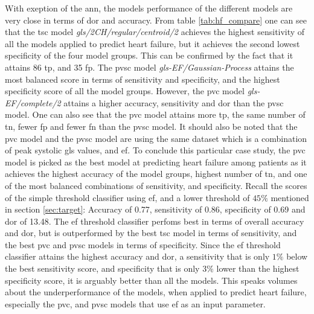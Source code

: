 With exeption of the \acrshort{ann}, the models performance of the different models are very close in terms of \acrshort{dor} and accuracy. From table \ref{tab:hf_compare} one can see that the \acrshort{tsc} model \textit{gls/2CH/regular/centroid/2} achieves the highest sensitivity of all the models applied to predict heart failure, but it achieves the second lowest specificity of the four model groups. This can be confirmed by the fact that it attains 86 \acrshort{tp}, and 35 \acrshort{fp}. The \acrshort{pvsc} model \textit{gls-EF/Gaussian-Process} attains the most balanced score in terms of sensitivity and specificity, and the highest specificity score of all the model groups. However, the \acrshort{pvc} model \textit{gls-EF/complete/2} attains a higher accuracy, sensitivity and \acrshort{dor} than the \acrshort{pvsc} model. One can also see that the \acrshort{pvc} model attains more \acrshort{tp}, the same number of \acrshort{tn}, fewer \acrshort{fp} and fewer \acrshort{fn} than the \acrshort{pvsc} model. It should also be noted that the \acrshort{pvc} model and the \acrshort{pvsc} model are using the same dataset which is a combination of peak systolic \acrshort{gls} values, and \acrshort{ef}. To conclude this particular case study, the \acrshort{pvc} model is picked as the best model at predicting heart failure among patients as it achieves the highest accuracy of the model groups, highest number of \acrshort{tn}, and one of the most balanced combinations of sensitivity, and specificity. Recall the scores of the simple threshold classifier using \acrshort{ef}, and a lower threshold of $45\%$ mentioned in section \ref{sec:target}: Accuracy of 0.77, sensitivity of 0.86, specificity of 0.69 and \acrshort{dor} of 13.48. The \acrshort{ef} threshold classifier perfoms best in terms of overall accuracy and \acrshort{dor}, but is outperformed by the best \acrshort{tsc} model in terms of sensitivity, and the best \acrshort{pvc} and \acrshort{pvsc} models in terms of specificity. Since the \acrshort{ef} threshold classifier attains the highest accuracy and \acrshort{dor}, a sensitivity that is only $1\%$ below the best sensitivity score, and specificity that is only $3\%$ lower than the highest specificity score, it is arguably better than all the models. This speaks volumes about the underperformance of the models, when applied to predict heart failure, especially the \acrshort{pvc}, and \acrshort{pvsc} models that use \acrshort{ef} as an input parameter. 

\newpage


